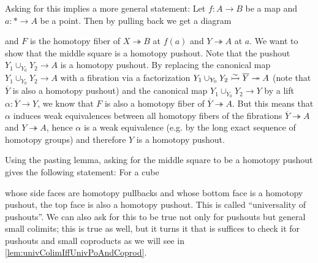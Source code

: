 Asking for this implies a more general statement:
Let $f\colon A\to B$ be a map and $a\colon *\to A$ be a point.
Then by pulling back we get a diagram 
\begin{center}
\end{center}
and $F$ is the homotopy fiber of $X\twoheadrightarrow B$ at $f(a)$ and $Y\twoheadrightarrow A$ at $a$.
We want to show that the middle square is a homotopy pushout.
Note that the pushout $Y_1\cup_{Y_0}Y_2\to A$ is a homotopy pushout. 
By replacing the canonical map $Y_1\cup_{Y_0}Y_2\to A$ with a fibration via a factorization $Y_1\cup_{Y_0}Y_2\xtailrightarrow{\sim}\overline{Y}\twoheadrightarrow A$ (note that $\overline{Y}$ is also a homotopy pushout) and the canonical map $Y_1\cup_{Y_0}Y_2\to Y$ by a lift $\alpha\colon\overline{Y}\to Y$, we know that $F$ is also a homotopy fiber of $\overline{Y}\twoheadrightarrow A$.
But this means that $\alpha$ induces weak equivalences between all homotopy fibers of the fibrations $\overline{Y}\twoheadrightarrow A$ and $Y\twoheadrightarrow A$, hence $\alpha$ is a weak equivalence (e.g. by the long exact sequence of homotopy groups) and therefore $Y$ is a homotopy pushout.

Using the pasting lemma, asking for the middle square to be a homotopy pushout gives the following statement: 
For a cube 
\begin{center}
\end{center}
whose side faces are homotopy pullbacks and whose bottom face is a homotopy pushout, the top face is also a homotopy pushout.
This is called  ``universality of pushouts''.
We can also ask for this to be true not only for pushouts but general small colimits; this is true as well, but it turns it that is suffices to check it for pushouts and small coproducts as we will see in \cref{lem:univColimIffUnivPoAndCoprod}.

